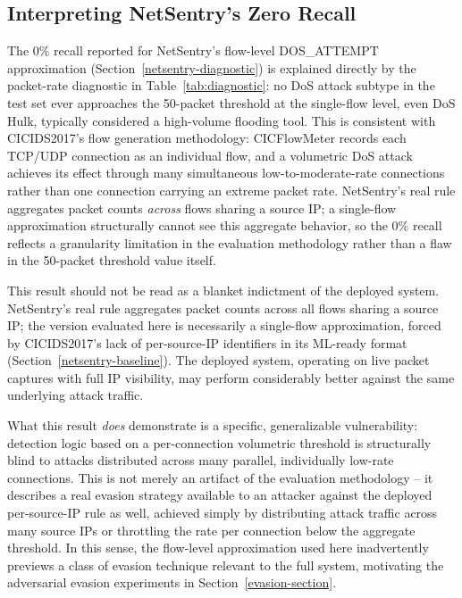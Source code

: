 \documentclass[conference]{IEEEtran}
\begin{document}
\subsection{Interpreting NetSentry's Zero Recall}
 
The 0\% recall reported for NetSentry's flow-level DOS\_ATTEMPT approximation (Section~\ref{netsentry-diagnostic}) is explained directly by the packet-rate diagnostic in Table~\ref{tab:diagnostic}: no DoS attack subtype in the test set ever approaches the 50-packet threshold at the single-flow level, even DoS Hulk, typically considered a high-volume flooding tool. This is consistent with CICIDS2017's flow generation methodology: CICFlowMeter records each TCP/UDP connection as an individual flow, and a volumetric DoS attack achieves its effect through many simultaneous low-to-moderate-rate connections rather than one connection carrying an extreme packet rate. NetSentry's real rule aggregates packet counts \emph{across} flows sharing a source IP; a single-flow approximation structurally cannot see this aggregate behavior, so the 0\% recall reflects a granularity limitation in the evaluation methodology rather than a flaw in the 50-packet threshold value itself.
 
This result should not be read as a blanket indictment of the deployed system. NetSentry's real rule aggregates packet counts across all flows sharing a source IP; the version evaluated here is necessarily a single-flow approximation, forced by CICIDS2017's lack of per-source-IP identifiers in its ML-ready format (Section~\ref{netsentry-baseline}). The deployed system, operating on live packet captures with full IP visibility, may perform considerably better against the same underlying attack traffic.
 
What this result \emph{does} demonstrate is a specific, generalizable vulnerability: detection logic based on a per-connection volumetric threshold is structurally blind to attacks distributed across many parallel, individually low-rate connections. This is not merely an artifact of the evaluation methodology -- it describes a real evasion strategy available to an attacker against the deployed per-source-IP rule as well, achieved simply by distributing attack traffic across many source IPs or throttling the rate per connection below the aggregate threshold. In this sense, the flow-level approximation used here inadvertently previews a class of evasion technique relevant to the full system, motivating the adversarial evasion experiments in Section~\ref{evasion-section}.
 
\end{document}
